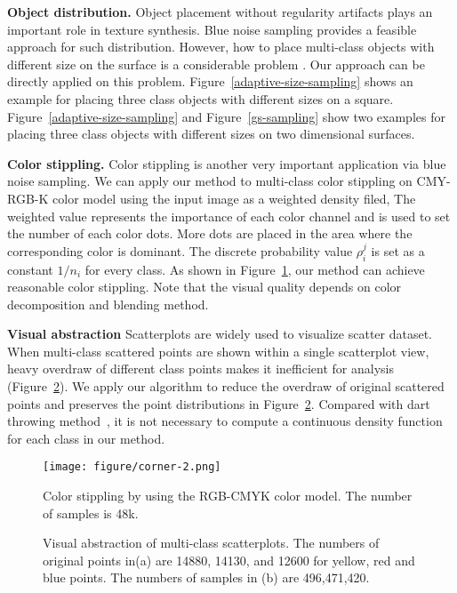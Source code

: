 \textbf{Object distribution.}
Object placement without regularity artifacts plays an important role in texture synthesis.
Blue noise sampling provides a feasible approach for such distribution.
However,
how to place multi-class objects with different size on the surface is a considerable problem .
Our approach can be directly applied on this problem.
Figure~\ref{adaptive-size-sampling} shows an example for placing three class objects with different sizes on a square.
Figure~\ref{adaptive-size-sampling} and Figure~\ref{gs-sampling} show two examples for placing three class objects with different sizes on two dimensional surfaces.

\textbf{Color stippling.}
Color stippling is another very important application via blue noise sampling.
We can apply our method to multi-class color stippling on CMY-RGB-K color model using the input image as a weighted density filed,
The weighted value represents the importance of each color channel and is used to set the number of each color dots.
More dots are placed in the
area where the corresponding color is dominant.
The discrete probability value $\rho_i^j$ is set as a constant $1/n_i$ for every class.
As shown in Figure~\ref{Color stippling},
our method can achieve reasonable color stippling.
Note that the visual quality depends on color decomposition and blending method.

\textbf{Visual abstraction}
Scatterplots are widely used to visualize scatter dataset.
When multi-class scattered points are shown within a single scatterplot view, heavy overdraw of different class points makes it inefficient for analysis (Figure~\ref{visual-abstraction}).
We apply our algorithm to reduce the overdraw of original scattered points and preserves the point distributions in Figure~\ref{visual-abstraction}.
Compared with dart throwing method~\cite{wei:2010:multi,chen:2014:visual},
it is not necessary to compute a continuous density function for each class in our method.



\begin{figure}[htb]
  \centering
    \texttt{[image: figure/corner-2.png]}
   \caption{Color stippling by using the RGB-CMYK color model.
  The number of samples is 48k.  }\label{Color stippling}
\end{figure}

\begin{figure}[htb]
  \centering

  \caption{Visual abstraction of multi-class scatterplots.
   The numbers of original points in(a) are 14880, 14130, and 12600 for yellow, red and blue points.
   The numbers of samples in (b) are 496,471,420.}
   \label{visual-abstraction}
\end{figure}
